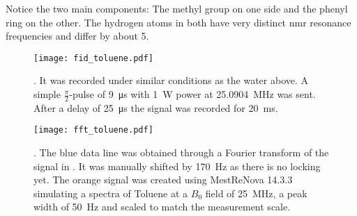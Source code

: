 \begin{marginfigure}
    \centering
    
    \caption{ Notice the two main components: The  methyl group on one side and the phenyl ring on the other. The hydrogen atoms in both have very distinct \acrshort{nmr} resonance frequencies and differ by about \qty{5}{\partspermillion}.}
\end{marginfigure}

\begin{figure}[h!bt]
    \centering
    \texttt{[image: fid\_toluene.pdf]}
    \caption{. It was recorded under similar conditions as the water above. A simple \(\frac{\pi}{2}\)-pulse of \qty{9}{\micro\second} with \qty{1}{\watt} power at \qty{25.0904}{\mega\hertz} was sent. After a delay of \qty{25}{\micro\second} the signal was recorded for \qty{20}{\milli\second}.}
\end{figure}

\begin{figure}[h!bt]
    \centering
    \texttt{[image: fft\_toluene.pdf]}
    \caption{. The blue data line was obtained through a Fourier transform of the signal in . It was manually shifted by \qty{170}{\hertz} as there is no locking yet. The orange signal was created using MestReNova 14.3.3 simulating a spectra of Toluene at a $B_0$ field of \qty{25}{\mega\hertz}, a peak width of \qty{50}{\hertz} and scaled to match the measurement scale.}
\end{figure}